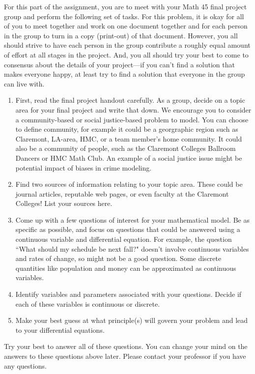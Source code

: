 \documentclass[12pt,letterpaper]{hmcpset}
\begin{document}
\begin{problem}[5]
    For this part of the assignment, you are to meet with your Math 45 final project group and perform the following set of tasks.  For this problem, it is okay for all of you to meet together and work on one document together and for each person in the group to turn in a copy (print-out) of that document.  However, you all should strive to have each person in the group contribute a roughly equal amount of effort at all stages in the project.  And, you all should try your best to come to consensus about the details of your project---if you can't find a solution that makes everyone happy, at least try to find a solution that everyone in the group can live with.

    \begin{enumerate}
        \item First, read the final project handout carefully. As a group, decide on a topic area for your final project and write that down. We encourage you to consider a community-based or social justice-based problem to model.  You can choose to define community, for example it could be a georgraphic region such as Claremont, LA-area, HMC, or a team member's home community.  It could also be a community of people, such as the Claremont Colleges Ballroom Dancers or HMC Math Club.  An example of a social justice issue might be potential impact of biases in crime modeling.

        \item Find two sources of information relating to your topic area.  These could be journal articles, reputable web pages, or even faculty at the Claremont Colleges!  List your sources here.

        \item Come up with a few questions of interest for your mathematical model.  Be as specific as possible, and focus on questions that could be answered using a continuous variable and differential equation.  For example, the question ``What should my schedule be next fall?" doesn't involve continuous variables and rates of change, so might not be a good question.  Some discrete quantities like population and money can be approximated as continuous variables.

        \item Identify variables and parameters associated with your questions.  Decide if each of these variables is continuous or discrete.

        \item Make your best guess at what principle(s) will govern your problem and lead to your differential equations.
    \end{enumerate}
    Try your best to answer all of these questions. You can change your mind on the answers to these questions above later. Please contact your professor if you have any questions.

\end{problem}
\newpage
\begin{solution}
    \null\vfill
\end{solution}
\end{document}
